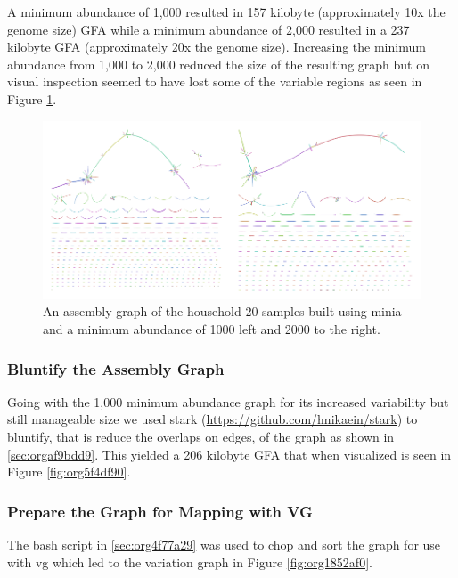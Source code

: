 \documentclass[10pt, a4paper]{article}
\begin{document}
A minimum abundance of 1,000 resulted in 157 kilobyte
(approximately 10x the genome size) GFA while a minimum abundance of 2,000 
resulted in a 237 kilobyte GFA (approximately 20x the genome size).
Increasing the minimum abundance from 1,000 to 2,000 reduced the size of the 
resulting graph but on visual inspection seemed to have lost some of 
the variable regions as seen in Figure \ref{fig:orga2b6927}.

\begin{figure}[h]
\centering
\includegraphics[scale=1.0]{../Figures/RSV/Assembly_Combined.png}
\caption[RSV Assembly Graph]{\label{fig:orga2b6927}An assembly graph of the household 20 samples built using minia and a minimum abundance of 1000 left and 2000 to the right.}
\end{figure}

\subsubsection{Bluntify the Assembly Graph}
\label{sec:orgf9ddb3c}
Going with the 1,000 minimum abundance graph for its increased variability but 
still manageable size we used stark (\url{https://github.com/hnikaein/stark}) to 
bluntify, that is reduce the overlaps on edges,
 \cite{gargGraphbasedApproachDiploid2018} of the graph as shown in
\ref{sec:orgaf9bdd9}.
This yielded a 206 kilobyte GFA that when visualized is seen in Figure
\ref{fig:org5f4df90}.

\subsubsection{Prepare the Graph for Mapping with VG}
\label{sec:orgc7eec7f}
The bash script in \ref{sec:org4f77a29} was used to chop and sort the graph
for use with vg \cite{garrisonVariationGraphToolkit2018} which led to the 
variation graph in Figure \ref{fig:org1852af0}.
\end{document}
